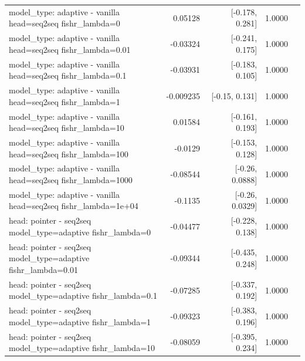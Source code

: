 \documentclass[10pt]{article}
\makeatletter
\newcommand{\stackcell}[1]{\begin{tabular}[t]{@{}l@{}}#1\end{tabular}}
\makeatother
\begin{document}
{\begin{longtable}{lrrrl}
\stackcell{model\_type: adaptive - vanilla\\\footnotesize head=seq2seq fishr\_lambda=0 } & 0.05128 & [-0.178, 0.281] & 1.0000 & \\
\stackcell{model\_type: adaptive - vanilla\\\footnotesize head=seq2seq fishr\_lambda=0.01 } & -0.03324 & [-0.241, 0.175] & 1.0000 & \\
\stackcell{model\_type: adaptive - vanilla\\\footnotesize head=seq2seq fishr\_lambda=0.1 } & -0.03931 & [-0.183, 0.105] & 1.0000 & \\
\stackcell{model\_type: adaptive - vanilla\\\footnotesize head=seq2seq fishr\_lambda=1 } & -0.009235 & [-0.15, 0.131] & 1.0000 & \\
\stackcell{model\_type: adaptive - vanilla\\\footnotesize head=seq2seq fishr\_lambda=10 } & 0.01584 & [-0.161, 0.193] & 1.0000 & \\
\stackcell{model\_type: adaptive - vanilla\\\footnotesize head=seq2seq fishr\_lambda=100 } & -0.0129 & [-0.153, 0.128] & 1.0000 & \\
\stackcell{model\_type: adaptive - vanilla\\\footnotesize head=seq2seq fishr\_lambda=1000 } & -0.08544 & [-0.26, 0.0888] & 1.0000 & \\
\stackcell{model\_type: adaptive - vanilla\\\footnotesize head=seq2seq fishr\_lambda=1e+04 } & -0.1135 & [-0.26, 0.0329] & 1.0000 & \\
\stackcell{head: pointer - seq2seq\\\footnotesize model\_type=adaptive fishr\_lambda=0 } & -0.04477 & [-0.228, 0.138] & 1.0000 & \\
\stackcell{head: pointer - seq2seq\\\footnotesize model\_type=adaptive fishr\_lambda=0.01 } & -0.09344 & [-0.435, 0.248] & 1.0000 & \\
\stackcell{head: pointer - seq2seq\\\footnotesize model\_type=adaptive fishr\_lambda=0.1 } & -0.07285 & [-0.337, 0.192] & 1.0000 & \\
\stackcell{head: pointer - seq2seq\\\footnotesize model\_type=adaptive fishr\_lambda=1 } & -0.09323 & [-0.383, 0.196] & 1.0000 & \\
\stackcell{head: pointer - seq2seq\\\footnotesize model\_type=adaptive fishr\_lambda=10 } & -0.08059 & [-0.395, 0.234] & 1.0000 & \\

\end{longtable}}
\end{document}
